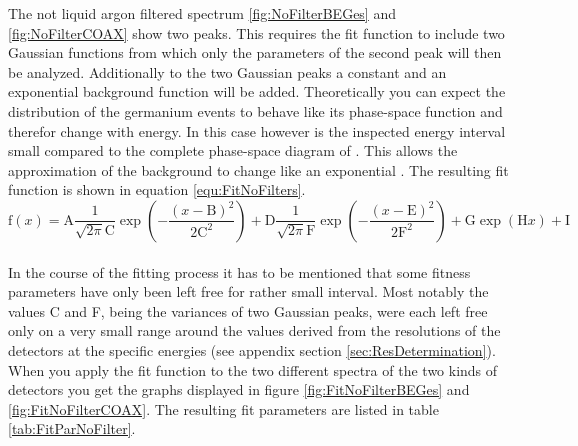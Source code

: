 The not liquid argon filtered spectrum \ref{fig:NoFilterBEGes} and \ref{fig:NoFilterCOAX} show two peaks.
This requires the fit function to include two Gaussian functions from which only the parameters of the second peak will then be analyzed.
Additionally to the two Gaussian peaks a constant and an exponential background function will be added.
Theoretically you can expect the distribution of the germanium events to behave like its phase-space function and therefor change with energy.
In this case however is the inspected energy interval small compared to the complete phase-space diagram of .
This allows the approximation of the background to change like an exponential .
The resulting fit function is shown in equation \ref{equ:FitNoFilters}.
\\

\begin{equation}
\mathrm{f}(x) = \mathrm{A}\frac{1}{\sqrt{2\pi}\mathrm{C}}\exp\left(-\frac{(x-\mathrm{B})^2}{2\mathrm{C}^2}\right) + \mathrm{D}\frac{1}{\sqrt{2\pi}\mathrm{F}}\exp\left(-\frac{(x-\mathrm{E})^2}{2\mathrm{F}^2}\right) + \mathrm{G}\exp\left(\mathrm{H}x\right) + \mathrm{I}
\label{equ:FitNoFilters}
\end{equation}
\\

In the course of the fitting process it has to be mentioned that some fitness parameters have only been left free for rather small interval.
Most notably the values C and F, being the variances of two Gaussian peaks, were each left free only on a very small range around the values derived from the resolutions of the detectors at the specific energies (see appendix section \ref{sec:ResDetermination}).
When you apply the fit function to the two different spectra of the two kinds of detectors you get the graphs displayed in figure \ref{fig:FitNoFilterBEGes} and \ref{fig:FitNoFilterCOAX}.
The resulting fit parameters are listed in table \ref{tab:FitParNoFilter}. 
\\

